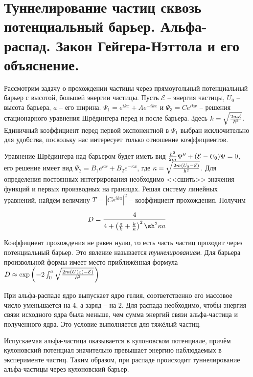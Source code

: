 \section{Туннелирование частиц сквозь потенциальный барьер. Альфа-распад. Закон Гейгера-Нэттола и его
объяснение.}

Рассмотрим задачу о прохождении частицы через прямоугольный потенциальный барьер с высотой, большей энергии частицы. Пусть $\mathcal{E}$ -- энергия частицы, $U_0$ -- высота барьера, $a$ -- его ширина. $\Psi_1 = e^{i k x} + A e^{- i k x}$ и $\Psi_3 = C e^{i k x}$ -- решения стационарного уравнения Шрёдингера перед и после барьера. Здесь $k = \sqrt{\frac{2 m \mathcal{E}}{\hbar^2}}$. Единичный коэффициент перед первой экспонентной в $\Psi_1$ выбран исключительно для удобства, поскольку нас интересует только отношение коэффициентов.

Уравнение Шрёдингера над барьером будет иметь вид $\frac{\hbar^2}{2 m} \Psi'' + (\mathcal{E} - U_0) \Psi = 0$, его решение имеет вид $\Psi_2 = B_1 e^{\kappa x} + B_2 e^{- \kappa x}$, где $\kappa = \sqrt{\frac{2 m (U_0 - \mathcal{E})}{\hbar^2}}$. Для определения постоянных интегрирования необходимо <<сшить>> значения функций и первых производных на границах. Решая систему линейных уравнений, найдём величину $T = \left| C e^{i k a} \right|^2$ -- коэффициент прохождения. Получим

\begin{equation}
    D = \frac{4}{4 + \left( \frac{\kappa}{k} + \frac{k}{\kappa} \right)^2 \sh^2 \kappa a}
\end{equation}

\noindent
Коэффициент прохождения не равен нулю, то есть часть частиц проходит через потенциальный барьер. Это явление называется \textit{туннелированием}. Для барьера произвольной формы имеет место приближённая формула $D \approx \exp \left( - 2 \int_0^a \sqrt{\frac{2 m \left( U (x) - \mathcal{E} \right)}{\hbar^2}} \right)$

При альфа-распаде ядро выпускает ядро гелия, соответственно его массовое число уменьшается на 4, а заряд -- на 2. Для распада необходимо, чтобы энергия связи исходного ядра была меньше, чем сумма энергий связи альфа-частица и полученного ядра. Это условие выполняется для тяжёлый частиц.

Испускаемая альфа-частица оказывается в кулоновском потенциале, причём кулоновский потенциал значительно превышает энергию наблюдаемых в эксперименте частиц. Таким образом, при распаде происходит туннелирование альфа-частицы через кулоновский барьер.

